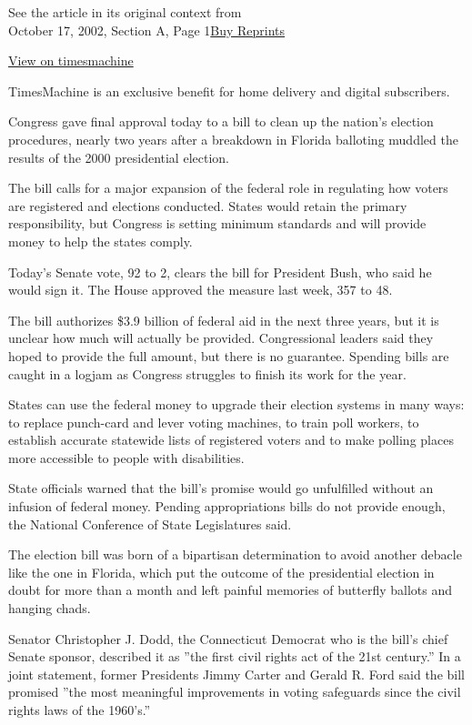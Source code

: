 See the article in its original context from\\
October 17, 2002, Section A, Page
1\href{https://store.nytimes.com/collections/new-york-times-page-reprints?utm_source=nytimes\&utm_medium=article-page\&utm_campaign=reprints}{Buy
Reprints}

\href{http://timesmachine.nytimes.com/timesmachine/2002/10/17/427322.html}{View
on timesmachine}

TimesMachine is an exclusive benefit for home delivery and digital
subscribers.

Congress gave final approval today to a bill to clean up the nation's
election procedures, nearly two years after a breakdown in Florida
balloting muddled the results of the 2000 presidential election.

The bill calls for a major expansion of the federal role in regulating
how voters are registered and elections conducted. States would retain
the primary responsibility, but Congress is setting minimum standards
and will provide money to help the states comply.

Today's Senate vote, 92 to 2, clears the bill for President Bush, who
said he would sign it. The House approved the measure last week, 357 to
48.

The bill authorizes \$3.9 billion of federal aid in the next three
years, but it is unclear how much will actually be provided.
Congressional leaders said they hoped to provide the full amount, but
there is no guarantee. Spending bills are caught in a logjam as Congress
struggles to finish its work for the year.

States can use the federal money to upgrade their election systems in
many ways: to replace punch-card and lever voting machines, to train
poll workers, to establish accurate statewide lists of registered voters
and to make polling places more accessible to people with disabilities.

State officials warned that the bill's promise would go unfulfilled
without an infusion of federal money. Pending appropriations bills do
not provide enough, the National Conference of State Legislatures said.

The election bill was born of a bipartisan determination to avoid
another debacle like the one in Florida, which put the outcome of the
presidential election in doubt for more than a month and left painful
memories of butterfly ballots and hanging chads.

Senator Christopher J. Dodd, the Connecticut Democrat who is the bill's
chief Senate sponsor, described it as ''the first civil rights act of
the 21st century.'' In a joint statement, former Presidents Jimmy Carter
and Gerald R. Ford said the bill promised ''the most meaningful
improvements in voting safeguards since the civil rights laws of the
1960's.''

